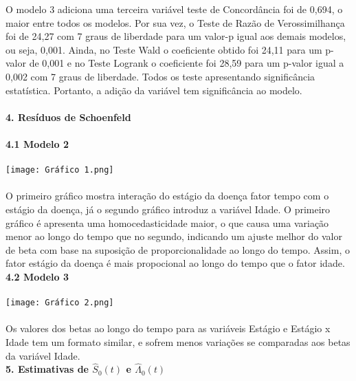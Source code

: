 \documentclass[12pt,a4paper]{article}
\begin{document}
	\vspace{1cm}
	O modelo 3 adiciona uma terceira variável teste de Concordância foi de 0,694, o maior entre todos os modelos. Por sua vez, o Teste de Razão de Verossimilhança foi de 24,27 com 7 graus de liberdade para um valor-p igual aos demais modelos, ou seja, 0,001. Ainda, no Teste Wald o coeficiente obtido foi 24,11 para um p-valor de 0,001 e no Teste Logrank o coeficiente foi 28,59 para um p-valor igual a 0,002 com 7 graus de liberdade. Todos os teste apresentando significância estatística. Portanto, a adição da variável tem significância ao modelo.\\
 	\vspace{2cm}\\
 	\textbf{4. Resíduos de Schoenfeld}\\
 	\vspace{1cm}\\
 	\textbf{4.1 Modelo 2}\\
 	\vspace{1cm}\\
 	\texttt{[image: Gráfico 1.png]}\\
 	\vspace{1cm}\\
 	O primeiro gráfico mostra interação do estágio da doença fator tempo com o estágio da doença, já o segundo gráfico introduz a variável Idade. O primeiro gráfico é apresenta uma homocedasticidade maior, o que causa uma variação menor ao longo do tempo que no segundo, indicando um ajuste melhor do valor de beta com base na suposição de proporcionalidade ao longo do tempo. Assim, o fator estágio da doença é mais propocional ao longo do tempo que o fator idade.
 	\vspace{2cm}\\
 	\textbf{4.2 Modelo 3}\\
 	\vspace{1cm}\\
 	\texttt{[image: Gráfico 2.png]}\\
 	\vspace{1cm}\\
 	Os valores dos betas ao longo do tempo para as variáveis Estágio e Estágio x Idade tem um formato similar, e sofrem menos variações se comparadas aos betas da variável Idade. 
 	\vspace{2cm}\\
 	\textbf{5. Estimativas de $\hat{S}_{0}(t)$ e $\hat{\Lambda}_{0}(t)$}\\
\end{document}
